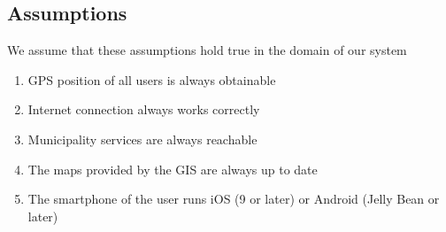 \subsection{Assumptions}
	We assume that these assumptions hold true in the domain of our system 
	\begin{enumerate}[label=\textbf{DA\arabic*}]
		\item GPS position of all users is always obtainable
		\item Internet connection always works correctly
		\item Municipality services are always reachable
		\item The maps provided by the GIS are always up to date
		\item The smartphone of the user runs iOS (9 or later) or Android (Jelly Bean or later)
	\end{enumerate}
		
\clearpage